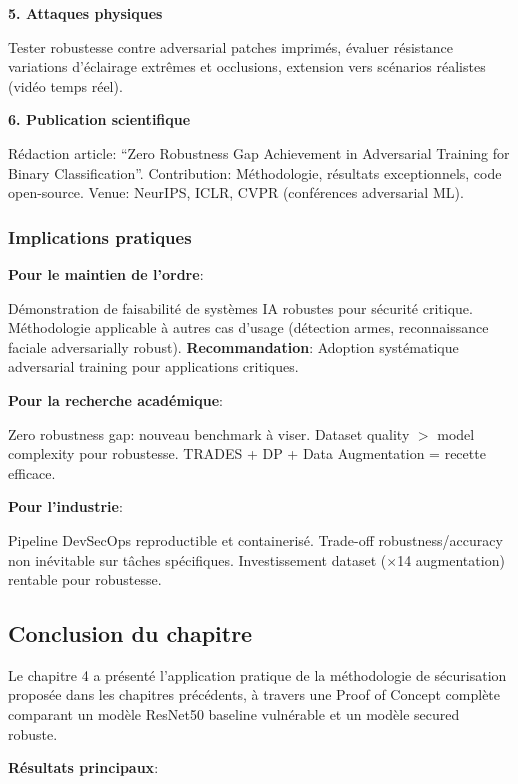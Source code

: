 \textbf{5. Attaques physiques}

Tester robustesse contre adversarial patches imprimés, évaluer résistance variations d'éclairage extrêmes et occlusions, extension vers scénarios réalistes (vidéo temps réel).

\textbf{6. Publication scientifique}

Rédaction article: ``Zero Robustness Gap Achievement in Adversarial Training for Binary Classification''. Contribution: Méthodologie, résultats exceptionnels, code open-source. Venue: NeurIPS, ICLR, CVPR (conférences adversarial ML).

\subsubsection{Implications pratiques}

\textbf{Pour le maintien de l'ordre}:

Démonstration de faisabilité de systèmes IA robustes pour sécurité critique. Méthodologie applicable à autres cas d'usage (détection armes, reconnaissance faciale adversarially robust). \textbf{Recommandation}: Adoption systématique adversarial training pour applications critiques.

\textbf{Pour la recherche académique}:

Zero robustness gap: nouveau benchmark à viser. Dataset quality $>$ model complexity pour robustesse. TRADES + DP + Data Augmentation = recette efficace.

\textbf{Pour l'industrie}:

Pipeline DevSecOps reproductible et containerisé. Trade-off robustness/accuracy non inévitable sur tâches spécifiques. Investissement dataset ($\times$14 augmentation) rentable pour robustesse.

\subsection{Conclusion du chapitre}

Le chapitre 4 a présenté l'application pratique de la méthodologie de sécurisation proposée dans les chapitres précédents, à travers une Proof of Concept complète comparant un modèle ResNet50 baseline vulnérable et un modèle secured robuste.

\textbf{Résultats principaux}:

